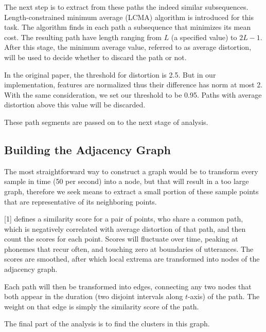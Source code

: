 \documentclass{article}
\begin{document}
        The next step is to extract from these paths the indeed similar subsequences. Length-constrained minimum
        average (LCMA) algorithm is introduced for this task. The algorithm finds in each path a subsequence
        that minimizes its mean cost. The resulting path have length ranging from $L$ (a specified value) to 
        $2L-1$. After this stage, the minimum average value, referred to as average distortion, will be used
        to decide whether to discard the path or not.

        In the original paper, the threshold for distortion is 2.5. But in our implementation, features are 
        normalized thus their difference has norm at most 2. With the same consideration, we set our 
        threshold to be 0.95. Paths with average distortion above this value will be discarded.

        These path segments are passed on to the next stage of analysis.

    \subsection{Building the Adjacency Graph}
        The most straightforward way to construct a graph would be to transform every sample in time (50 per 
        second) into a node, but that will result in a too large graph, therefore we seek means to extract 
        a small portion of these sample points that are representative of its neighboring points.

        [1] defines a similarity score for a pair of points, who share a common path, which is negatively 
        correlated with average distortion of that path, and then count the scores for each point. Scores
        will fluctuate over time, peaking at phonemes that recur often, and touching zero at boundaries of 
        utterances. The scores are smoothed, after which local extrema are transformed into nodes of 
        the adjacency graph.

        Each path will then be transformed into edges, connecting any two nodes that both appear in the
        duration (two disjoint intervals along $t$-axis) of the path. The weight on that edge is simply the 
        similarity score of the path.

        The final part of the analysis is to find the clusters in this graph.
\end{document}
